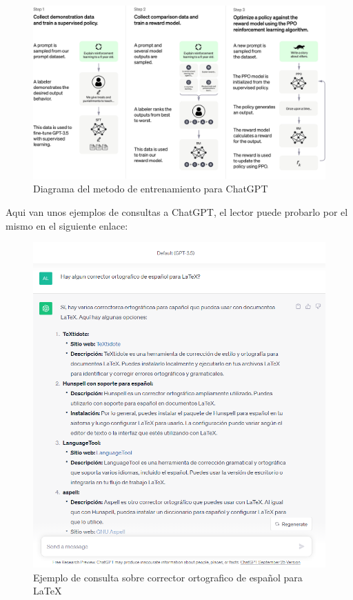 \documentclass[runningheads]{llncs} %
\begin{document}
\begin{figure}
    \centering
    \includegraphics[scale=0.4]{ChatGPT_Diagram.jpg}
    \caption{Diagrama del metodo de entrenamiento
    para ChatGPT \cite{ej-chatgpt}}
    \label{fig:chatgpt-diagrama}
\end{figure}

Aqui van unos ejemplos de consultas a ChatGPT, el lector puede probarlo por
el mismo en el siguiente enlace: 

\begin{figure}
    \centering
    \includegraphics[scale=0.55]{ej1-chatgpt.png}
    \caption{Ejemplo de consulta sobre corrector ortografico de español
    para LaTeX}
    \label{fig:chatgpt-ej1}
\end{figure}
\end{document}
